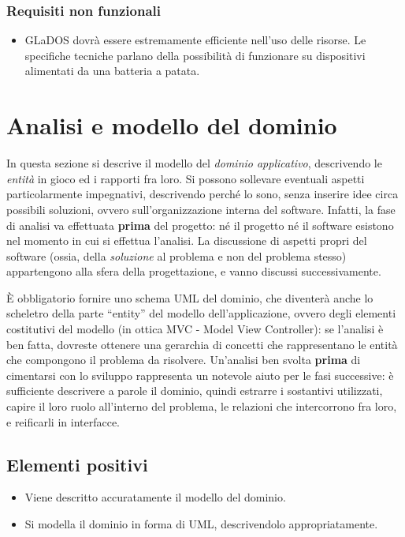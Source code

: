 \documentclass[a4paper,12pt]{report}
\begin{document}
\subsubsection{Requisiti non funzionali}
\begin{itemize}
	\item GLaDOS dovrà essere estremamente efficiente nell'uso delle risorse. Le specifiche tecniche parlano della possibilità di funzionare su dispositivi alimentati da una batteria a patata.
\end{itemize}

\section{Analisi e modello del dominio}

In questa sezione si descrive il modello del \textit{dominio
applicativo}, descrivendo le \textit{entità} in gioco ed i rapporti fra loro.
%
Si possono sollevare eventuali aspetti particolarmente impegnativi, descrivendo perché lo sono, senza inserire idee circa possibili soluzioni, ovvero sull'organizzazione interna del software.
%
Infatti, la fase di analisi va effettuata \textbf{prima} del progetto: né il progetto né il software esistono nel momento in cui si effettua l'analisi.
%
La discussione di aspetti propri del software (ossia, della \textit{soluzione} al problema e non del problema stesso) appartengono alla sfera della progettazione, e vanno discussi successivamente.

È obbligatorio fornire uno schema UML del dominio, che diventerà anche lo scheletro della
parte ``entity'' del modello dell'applicazione, ovvero degli elementi costitutivi del modello (in ottica MVC - Model View Controller): se l'analisi è ben fatta, dovreste ottenere una gerarchia di concetti che rappresentano le entità che compongono il problema da risolvere.
%
Un'analisi ben svolta \textbf{prima} di cimentarsi con lo sviluppo rappresenta un notevole aiuto per
le fasi successive: è sufficiente descrivere a parole il dominio, quindi estrarre i sostantivi
utilizzati, capire il loro ruolo all'interno del problema, le relazioni che intercorrono fra loro, e
reificarli in interfacce.

\subsection*{Elementi positivi}
\begin{itemize}
	\item Viene descritto accuratamente il modello del dominio.
	\item Si modella il dominio in forma di UML, descrivendolo appropriatamente.
\end{itemize}
\end{document}

